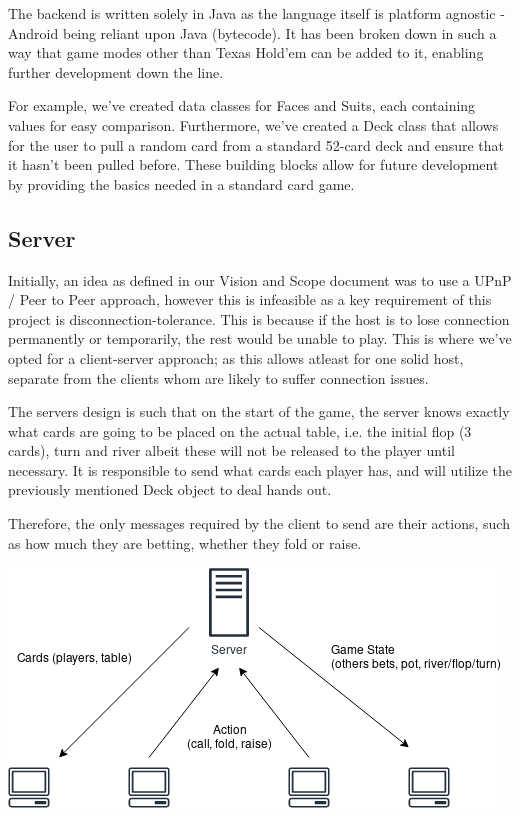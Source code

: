 \documentclass[11pt]{article}
\begin{document}
The backend is written solely in Java as the language itself is platform agnostic - Android being reliant upon Java (bytecode). It has been broken down in such a way that game modes other than Texas Hold'em can be added to it, enabling further development down the line. 

For example, we've created data classes for Faces and Suits, each containing values for easy comparison. Furthermore, we've created a Deck class that allows for the user to pull a random card from a standard 52-card deck and ensure that it hasn't been pulled before. These building blocks allow for future development by providing the basics needed in a standard card game.



\subsection{Server}

Initially, an idea as defined in our Vision and Scope document was to use a UPnP / Peer to Peer approach, however this is infeasible as a key requirement of this project is disconnection-tolerance. This is because if the host is to lose connection permanently or temporarily, the rest would be unable to play.
This is where we've opted for a client-server approach; as this allows atleast for one solid host, separate from the clients whom are likely to suffer connection issues. 

The servers design is such that on the start of the game, the server knows exactly what cards are going to be placed on the actual table, i.e. the initial flop (3 cards), turn and river albeit these will not be released to the player until necessary. It is responsible to send what cards each player has, and will utilize the previously mentioned Deck object to deal hands out. 

Therefore, the only messages required by the client to send are their actions, such as how much they are betting, whether they fold or raise. 

\begin{center}
\includegraphics[scale=0.65]{server_diag}
\end{center}
\end{document}

